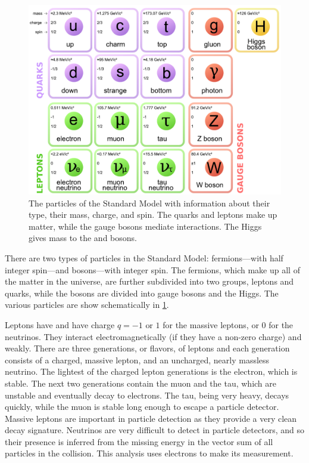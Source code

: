\begin{figure}[!htbp]
    \centering
    \includegraphics[width=\textwidth]{figures/standard_model.pdf}
    \caption[
        The particles of the Standard Model.
    ]{
        The particles of the Standard Model with information about their
        type, their mass, charge, and spin. The quarks and leptons make up
        matter, while the gauge bosons mediate interactions. The Higgs gives
        mass to the \W and \Z bosons.
    }
    \label{fig:standard_model}
\end{figure}

There are two types of particles in the Standard Model: fermions---with half
integer spin---and bosons---with integer spin. The fermions, which make up all
of the matter in the universe, are further subdivided into two groups, leptons
and quarks, while the bosons are divided into gauge bosons and the Higgs.  The
various particles are show schematically in \cref{fig:standard_model}.

Leptons have \spinhalf and have charge $q=-1 \text{ or } 1$ for the massive
leptons, or 0 for the neutrinos. They interact electromagnetically (if they
have a non-zero charge) and weakly. There are three generations, or flavors, of
leptons and each generation consists of a charged, massive lepton, and an
uncharged, nearly massless neutrino. The lightest of the charged lepton
generations is the electron, which is stable. The next two generations contain
the muon and the tau, which are unstable and eventually decay to electrons. The
tau, being very heavy, decays quickly, while the muon is stable long enough to
escape a particle detector. Massive leptons are important in particle detection
as they provide a very clean decay signature. Neutrinos are very difficult to
detect in particle detectors, and so their presence is inferred from the
missing energy in the vector sum of all particles in the collision. This
analysis uses electrons to make its measurement.

